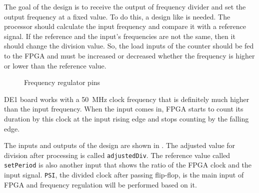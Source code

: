 \documentclass[12pt, logo=tehranDLDL/ut]{tehranDLDL}
\begin{document}
The goal of the design is to receive the output of frequency divider and set the output frequency at a fixed value. To do this, a design like  is needed. The processor should calculate the input frequency and compare it with a reference signal. If the reference and the input’s frequencies are not the same, then it should change the division value. So, the load inputs of the counter should be fed to the FPGA and must be increased or decreased whether the frequency is higher or lower than the reference value.

\begin{figure}[b]
    \caption{Frequency regulator pins\label{fig:freq_reg}}
    \centering
\end{figure}

DE1 board works with a \SI{50}{\mega\hertz} clock frequency that is definitely much higher than the input frequency. When the input comes in, FPGA starts to count its duration by this clock at the input rising edge and stops counting by the falling edge.

The inputs and outputs of the design are shown in . The adjusted value for division after processing is called \lstinline{adjustedDiv}. The reference value called \lstinline{setPeriod} is also another input that shows the ratio of the FPGA clock and the input signal. \lstinline{PSI}, the divided clock after passing flip-flop, is the main input of FPGA and frequency regulation will be performed based on it.
\end{document}
